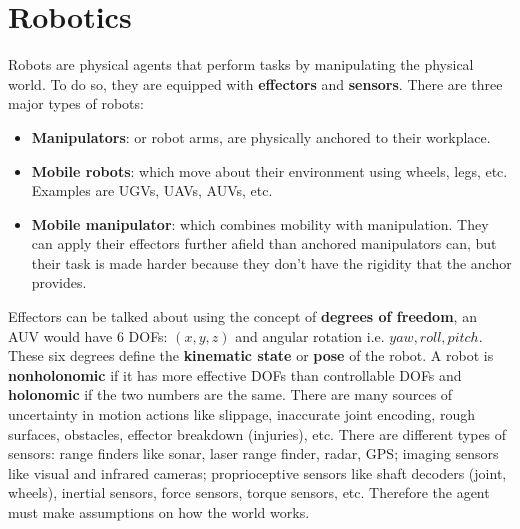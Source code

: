 \documentclass[twoside]{article}
\begin{document}
\section{Robotics}
Robots are physical agents that perform tasks by manipulating the physical world.
To do so, they are equipped with \textbf{effectors} and \textbf{sensors}. There 
are three major types of robots:
\begin{itemize}
        \item \textbf{Manipulators}: or robot arms, are physically anchored to 
        their workplace.
        \item \textbf{Mobile robots}: which move about their environment using
        wheels, legs, etc. Examples are UGVs, UAVs, AUVs, etc.
        \item \textbf{Mobile manipulator}: which combines mobility with manipulation.
        They can apply their effectors further afield than anchored manipulators
        can, but their task is made harder because they don't have the rigidity
        that the anchor provides.
\end{itemize}
Effectors can be talked about using the concept of \textbf{degrees of freedom},
an AUV would have 6 DOFs: \((x,y,z)\) and angular rotation i.e. \(yaw,roll,pitch\).
These six degrees define the \textbf{kinematic state} or \textbf{pose} of the robot.
A robot is \textbf{nonholonomic} if it has more effective DOFs than controllable
DOFs and \textbf{holonomic} if the two numbers are the same. There are many 
sources of uncertainty in motion actions like slippage, inaccurate joint 
encoding, rough surfaces, obstacles, effector breakdown (injuries), etc. There
are different types of sensors: range finders like sonar, laser range finder, 
radar, GPS; imaging sensors like visual and infrared cameras; proprioceptive 
sensors like shaft decoders (joint, wheels), inertial sensors, force sensors,
torque sensors, etc. Therefore the agent must make assumptions on how the world 
works.
\end{document}
